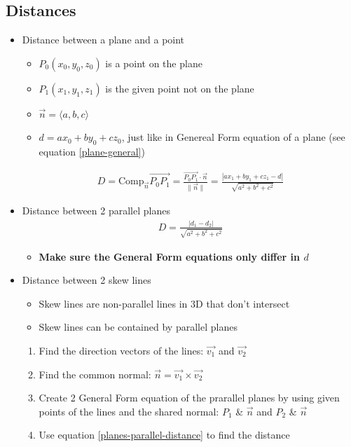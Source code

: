 \documentclass{article}
\begin{document}
\subsection{Distances}
\begin{itemize}
  \item Distance between a plane and a point
  \begin{itemize}
    \item $P_0(x_0, y_0, z_0)$ is a point on the plane
    \item $P_1(x_1, y_1, z_1)$ is the given point not on the plane
    \item $\vec{n} = \langle a, b, c \rangle$
    \item $d = ax_0 + by_0 + cz_0$, just like in Genereal Form equation of a plane (see equation \ref{plane-general})
  \end{itemize}
  \begin{align}
    D = \textrm{Comp}_{\vec{n}}\vec{P_0P_1} = \frac{\vec{P_0P_1}\cdot\vec{n}}{\|\vec{n}\|} = \frac{|ax_1 + by_1 + cz_1 - d|}{\sqrt{a^2 + b^2 + c^2}}
  \end{align}
  
  \item Distance between 2 parallel planes
  \begin{align}
    D = \frac{|d_1 - d_2|}{\sqrt{a^2 + b^2 + c^2}} \label{planes-parallel-distance}
  \end{align}
  \begin{itemize}
    \item \textbf{Make sure the General Form equations only differ in $d$}
  \end{itemize}

  \item Distance between 2 skew lines
  \begin{itemize}
    \item Skew lines are non-parallel lines in 3D that don't intersect
    \item Skew lines can be contained by parallel planes
  \end{itemize}
  \begin{enumerate}
    \item Find the direction vectors of the lines: $\vec{v_1}$ and $\vec{v_2}$
    \item Find the common normal: $\vec{n} = \vec{v_1}\times\vec{v_2}$
    \item Create 2 General Form equation of the prarallel planes by using given points of the lines and the shared normal: $P_1$ \& $\vec{n}$ and $P_2$ \& $\vec{n}$
    \item Use equation \ref{planes-parallel-distance} to find the distance
  \end{enumerate}


\end{itemize}
\end{document}
